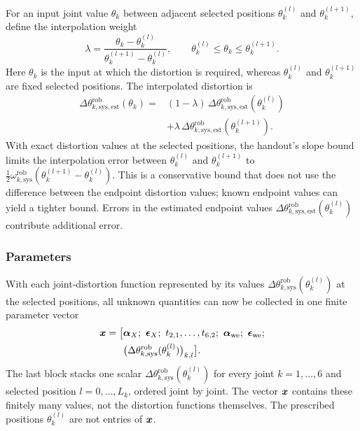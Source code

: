 \documentclass[../main.tex]{subfiles}
\begin{document}
For an input joint value $\theta_k$ between adjacent selected positions $\theta_k^{(l)}$ and $\theta_k^{(l+1)}$, define the interpolation weight
\begin{equation*}
\lambda=\frac{\theta_k-\theta_k^{(l)}}{\theta_k^{(l+1)}-\theta_k^{(l)}},\qquad \theta_k^{(l)}\leq\theta_k\leq\theta_k^{(l+1)}.
\end{equation*}
Here $\theta_k$ is the input at which the distortion is required, whereas $\theta_k^{(l)}$ and $\theta_k^{(l+1)}$ are fixed selected positions. The interpolated distortion is
\begin{equation}\label{eq:distortion-interpolation}
\begin{aligned}
\Delta\theta^{\mathrm{rob}}_{k,\mathrm{sys},\mathrm{est}}(\theta_k)
={}&(1-\lambda)\,\Delta\theta^{\mathrm{rob}}_{k,\mathrm{sys},\mathrm{est}}(\theta_k^{(l)})\\
&+\lambda\,\Delta\theta^{\mathrm{rob}}_{k,\mathrm{sys},\mathrm{est}}(\theta_k^{(l+1)}).
\end{aligned}
\end{equation}
With exact distortion values at the selected positions, the handout's slope bound limits the interpolation error between $\theta_k^{(l)}$ and $\theta_k^{(l+1)}$ to $\tfrac12\omega^{\mathrm{rob}}_{k,\mathrm{sys}}(\theta_k^{(l+1)}-\theta_k^{(l)})$. This is a conservative bound that does not use the difference between the endpoint distortion values; known endpoint values can yield a tighter bound. Errors in the estimated endpoint values $\Delta\theta^{\mathrm{rob}}_{k,\mathrm{sys},\mathrm{est}}(\theta_k^{(l)})$ contribute additional error.

\subsubsection{Parameters}
With each joint-distortion function represented by its values $\Delta\theta^{\mathrm{rob}}_{k,\mathrm{sys}}(\theta_k^{(l)})$ at the selected positions, all unknown quantities can now be collected in one finite parameter vector
\begin{equation}\label{eq:params}
\begin{aligned}
\vct{x}=\big[&\vct{\alpha}_X;\ \vct{\epsilon}_X;\ t_{2,1},\dots,t_{6,2};\ \vct{\alpha}_{\mathrm{we}};\ \vct{\epsilon}_{\mathrm{we}};\\
&\big(\Delta\theta^{\mathrm{rob}}_{k,\mathrm{sys}}(\theta_k^{(l)})\big)_{k,l}\big].
\end{aligned}
\end{equation}
The last block stacks one scalar $\Delta\theta^{\mathrm{rob}}_{k,\mathrm{sys}}(\theta_k^{(l)})$ for every joint $k=1,\dots,6$ and selected position $l=0,\dots,L_k$, ordered joint by joint. The vector $\bm{x}$ contains these finitely many values, not the distortion functions themselves. The prescribed positions $\theta_k^{(l)}$ are not entries of $\bm{x}$.
\end{document}

